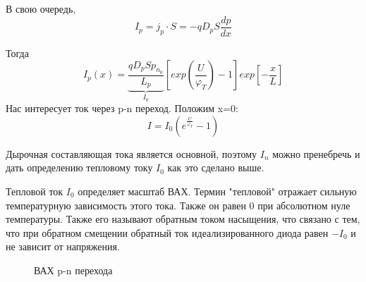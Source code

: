 В свою очередь, 
$$
I_p = j_p \cdot S = -qD_pS\frac{dp}{dx} 
$$

Тогда 
$$
I_p(x) = \underbrace{\frac{qD_pSp_{n_0}}{L_p}}_{I_0}\left[exp\left(\frac{U}{\varphi_T}\right) -1 \right] exp\left[-\frac{x}{L}\right]
$$
Нас интересует ток через p-n переход. Положим x=0:
\begin{equation}
I = I_0\left(e^{\frac{U}{\varphi_T}} -1 \right)
\end{equation}

Дырочная составляющая тока является основной, поэтому $I_n$ можно пренебречь и дать определению тепловому току $I_0$ как это сделано выше.

Тепловой ток $I_0$ определяет масштаб ВАХ. Термин "тепловой" отражает сильную температурную зависимость этого тока. Также он равен 0 при абсолютном нуле температуры. Также его называют обратным током насыщения, что связано с тем, что при обратном смещении обратный ток идеализированного диода равен $-I_0$ и не зависит от напряжения.

\begin{center}
	\begin{figure}[h!]
		\caption{ВАХ p-n перехода}
	\end{figure}
\end{center}


